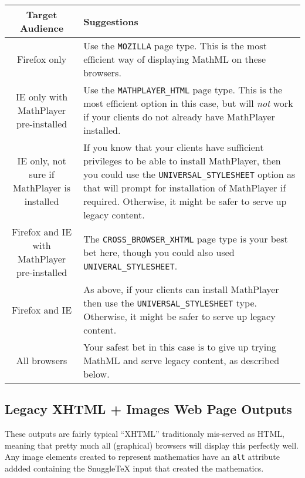 \begin{tabular}{|c|l|}
\hline
Target Audience & Suggestions \\
\hline
Firefox only &
Use the \verb|MOZILLA| page type. This is the most efficient %
way of displaying MathML on these browsers. \\
\hline
IE only with MathPlayer pre-installed &
Use the \verb|MATHPLAYER_HTML| page type. This is the most efficient %
option in this case, but will \emph{not} work if your clients do not %
already have MathPlayer installed. \\
\hline
IE only, not sure if MathPlayer is installed &
If you know that your clients have sufficient privileges to be able to %
install MathPlayer, then you could use the \verb|UNIVERSAL_STYLESHEET| option %
as that will prompt for installation of MathPlayer if required. %
Otherwise, it might be safer to serve up legacy content. \\
\hline
Firefox and IE with MathPlayer pre-installed &
The \verb|CROSS_BROWSER_XHTML| page type is your best bet here, though %
you could also used \verb|UNIVERAL_STYLESHEET|. \\
\hline
Firefox and IE &
As above, if your clients can install MathPlayer then use the %
\verb|UNIVERSAL_STYLESHEET| type. Otherwise, it might be safer %
to serve up legacy content. \\
\hline
All browsers &
Your safest bet in this case is to give up trying MathML and %
serve legacy content, as described below. \\
\hline
\end{tabular}

\subsection*{Legacy XHTML + Images Web Page Outputs}

These outputs are fairly typical ``XHTML'' traditionaly mis-served as HTML,
meaning that pretty much all (graphical) browsers will display this perfectly
well. Any image elements created to represent mathematics have an \verb|alt|
attribute addded containing the SnuggleTeX input that created the mathematics.
